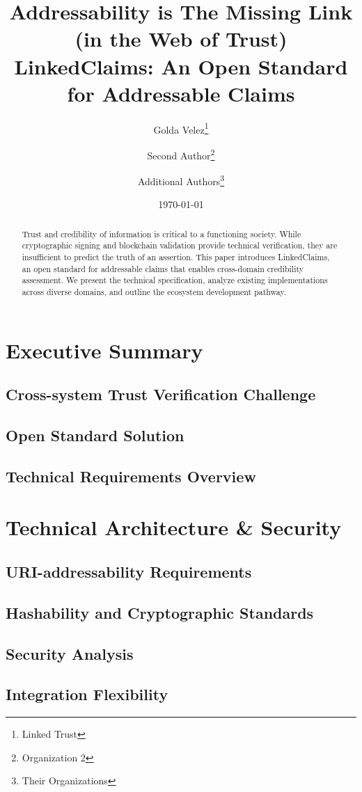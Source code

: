 \documentclass[11pt]{article}
\title{Addressability is The Missing Link (in the Web of Trust)\\[0.5em]\Large LinkedClaims: An Open Standard for Addressable Claims}
\author{
    Golda Velez\thanks{Linked Trust} \and
    Second Author\thanks{Organization 2} \and
    Additional Authors\thanks{Their Organizations}
}
\date{\today}
\begin{document}
\maketitle

\begin{abstract}
Trust and credibility of information is critical to a functioning society. While cryptographic signing and blockchain validation provide technical verification, they are insufficient to predict the truth of an assertion. This paper introduces LinkedClaims, an open standard for addressable claims that enables cross-domain credibility assessment. We present the technical specification, analyze existing implementations across diverse domains, and outline the ecosystem development pathway.
\end{abstract}

\section{Executive Summary}

\subsection{Cross-system Trust Verification Challenge}
\subsection{Open Standard Solution}
\subsection{Technical Requirements Overview}

\section{Technical Architecture \& Security}
\subsection{URI-addressability Requirements}
\subsection{Hashability and Cryptographic Standards}
\subsection{Security Analysis}
\subsection{Integration Flexibility}
\end{document}
